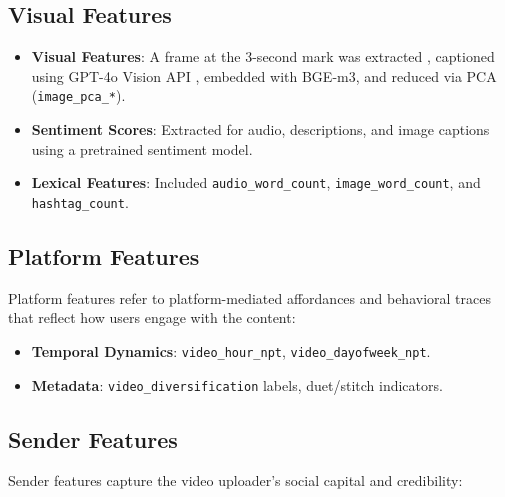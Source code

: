 \documentclass[12pt,a4paper]{report}
\begin{document}
\subsection{Visual Features}
\begin{itemize}
 \item \textbf{Visual Features}: A frame at the 3-second mark was extracted \parencite{TikTokCreative2023}, captioned using GPT-4o Vision API \parencite{OpenAI2024gpt4o}, embedded with BGE-m3, and reduced via PCA (\texttt{image\_pca\_*}).
    \item \textbf{Sentiment Scores}: Extracted for audio, descriptions, and image captions using a pretrained sentiment model.
    \item \textbf{Lexical Features}: Included \texttt{audio\_word\_count}, \texttt{image\_word\_count}, and \texttt{hashtag\_count}.    

\end{itemize}

\subsection{Platform Features}
Platform features refer to platform-mediated affordances and behavioral traces that reflect how users engage with the content:

\begin{itemize}
    \item \textbf{Temporal Dynamics}: \texttt{video\_hour\_npt}, \texttt{video\_dayofweek\_npt}.
    \item \textbf{Metadata}: \texttt{video\_diversification} labels, duet/stitch indicators.
\end{itemize}

\subsection{Sender Features}

Sender features capture the video uploader’s social capital and credibility:
\end{document}
